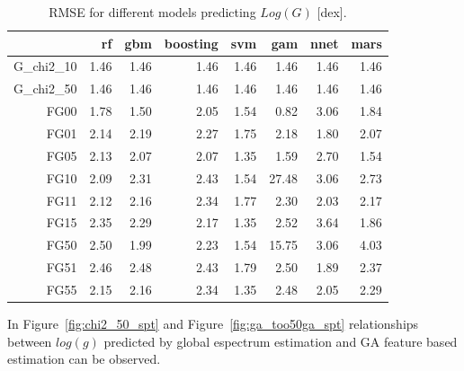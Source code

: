 {\begin{table}[ht]
\centering
\begin{tabular}{rrrrrrrr}
  \hline
 & rf & gbm & boosting & svm & gam & nnet & mars \\ 
  \hline
G\_chi2\_10 & 1.46 & 1.46 & 1.46 & 1.46 & 1.46 & 1.46 & 1.46 \\ 
  G\_chi2\_50 & 1.46 & 1.46 & 1.46 & 1.46 & 1.46 & 1.46 & 1.46 \\ 
  FG00 & 1.78 & 1.50 & 2.05 & 1.54 & 0.82 & 3.06 & 1.84 \\ 
  FG01 & 2.14 & 2.19 & 2.27 & 1.75 & 2.18 & 1.80 & 2.07 \\ 
  FG05 & 2.13 & 2.07 & 2.07 & 1.35 & 1.59 & 2.70 & 1.54 \\ 
  FG10 & 2.09 & 2.31 & 2.43 & 1.54 & 27.48 & 3.06 & 2.73 \\ 
  FG11 & 2.12 & 2.16 & 2.34 & 1.77 & 2.30 & 2.03 & 2.17 \\ 
  FG15 & 2.35 & 2.29 & 2.17 & 1.35 & 2.52 & 3.64 & 1.86 \\ 
  FG50 & 2.50 & 1.99 & 2.23 & 1.54 & 15.75 & 3.06 & 4.03 \\ 
  FG51 & 2.46 & 2.48 & 2.43 & 1.79 & 2.50 & 1.89 & 2.37 \\ 
  FG55 & 2.15 & 2.16 & 2.34 & 1.35 & 2.48 & 2.05 & 2.29 \\ 
   \hline
\end{tabular}
\caption { RMSE for different models predicting $Log(G)$ [dex].} 
\label{tab:models_G_mae} 
\end{table}


In Figure~\ref{fig:chi2_50_spt} and Figure~\ref{fig:ga_too50ga_spt} 
relationships between $log(g)$ predicted by global espectrum estimation 
and GA feature based estimation can be observed.

}
